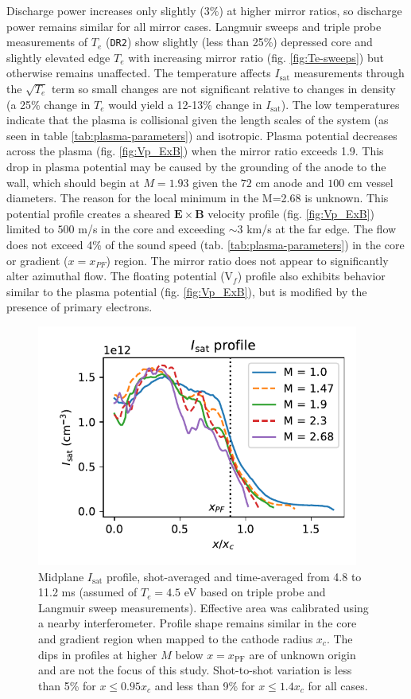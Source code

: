 Discharge power increases only slightly ($3\%$) at higher mirror ratios, so discharge power remains similar for all mirror cases. Langmuir sweeps and triple probe measurements of $T_e$ (\texttt{DR2}) show slightly (less than 25\%) depressed core and slightly elevated edge $T_e$ with increasing mirror ratio (fig. \ref{fig:Te-sweeps}) but otherwise remains unaffected. The temperature affects $I_\text{sat}$ measurements through the $\sqrt{T_e}$ term so small changes are not significant relative to changes in density (a 25\% change in $T_e$ would yield a 12-13\% change in $I_\text{sat}$). The low temperatures indicate that the plasma is collisional given the length scales of the system (as seen in table \ref{tab:plasma-parameters}) and isotropic. Plasma potential decreases across the plasma (fig. \ref{fig:Vp_ExB}) when the mirror ratio exceeds 1.9. This drop in plasma potential may be caused by the grounding of the anode to the wall, which should begin at $M=1.93$ given the $72$ cm anode and $100$ cm vessel diameters. The reason for the local minimum in the M=2.68 is unknown. This potential profile creates a sheared $\boldsymbol{E \times B}$ velocity profile (fig. \ref{fig:Vp_ExB}) limited to $500$ m/s in the core and exceeding $\sim 3$ km/s at the far edge. The flow does not exceed 4\% of the sound speed (tab. \ref{tab:plasma-parameters}) in the core or gradient ($x=x_{PF}$) region. The mirror ratio does not appear to significantly alter azimuthal flow. The floating potential (V$_f$) profile also exhibits behavior similar to the plasma potential (fig. \ref{fig:Vp_ExB}), but is modified by the presence of primary electrons. 



\begin{figure}
    \centering
    \includegraphics[width=300pt]{figures/fig3.pdf}
    \caption[Midplane $I_\text{sat}$ profile]{Midplane $I_\text{sat}$ profile, shot-averaged and time-averaged from 4.8 to 11.2 ms (assumed of $T_e = 4.5$ eV based on triple probe and Langmuir sweep measurements). Effective area was calibrated using a nearby interferometer. Profile shape remains similar in the core and gradient region when mapped to the cathode radius $x_c$. The dips in profiles at higher $M$ below $x=x_\text{PF}$ are of unknown origin and are not the focus of this study. Shot-to-shot variation is less than 5\% for $x \leq 0.95 x_c$ and less than 9\% for $x \leq 1.4 x_c$ for all cases.}
    \label{fig:isat_profile}
\end{figure}

